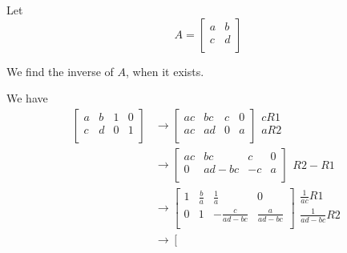 \documentclass{article}
\begin{document}
\begin{proposition}
  Let \[
    A =
    \begin{bmatrix}
      a & b\\
      c & d\\
    \end{bmatrix}
  \]

  We find the inverse of $A$, when it exists.

  We have
  \begin{align*}
    \left[
      \begin{array}{cc|cc}
        a & b & 1 & 0\\
        c & d & 0 & 1\\
      \end{array}
    \right]
    &\to
    \left[
      \begin{array}{cc|cc}
        ac & bc & c & 0\\
        ac & ad & 0 & a\\
      \end{array}
    \right]
    \begin{matrix}
      cR1\\
      aR2\\
    \end{matrix}
    \\
    &\to
    \left[
      \begin{array}{cc|cc}
        ac & bc & c & 0\\
        0 & ad - bc & -c & a\\
      \end{array}
    \right]
    \begin{matrix}
      \\
      R2 - R1\\
    \end{matrix}
    \\
    &\to
    \left[
      \begin{array}{cc|cc}
        1 & \frac{b}{a} & \frac{1}{a} & 0\\
        0 & 1 & -\frac{c}{ad-bc} & \frac{a}{ad-bc}\\
      \end{array}
    \right]
    \begin{matrix}
      \frac{1}{ac}R1\\
      \frac{1}{ad-bc}R2\\
    \end{matrix}
    \\
    &\to
    \left[
      \begin{array}{cc|cc}

\end{array}
\end{align*}
\end{proposition}
\end{document}
